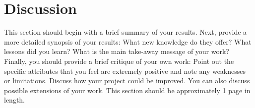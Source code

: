 \section{Discussion}

This section should begin with a brief summary of your results. Next, provide a
more detailed synopsis of your results: What new knowledge do they offer? What
lessons did you learn? What is the main take-away message of your work?
Finally, you should provide a brief critique of your own work: Point out the
specific attributes that you feel are extremely positive and note any
weaknesses or limitations. Discuss how your project could be improved. You can
also discuss possible extensions of your work. This section should be
approximately 1 page in length.